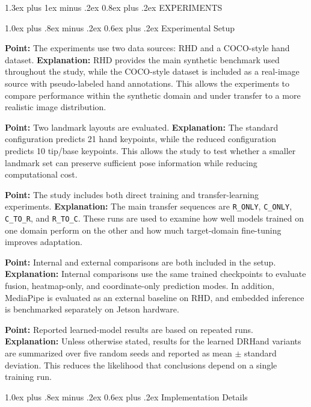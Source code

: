 \documentclass[10pt,letterpaper]{article}
\makeatletter
\renewcommand\section{\@startsection{section}{1}{\z@}%
  {1.3ex plus 1ex minus .2ex}%
  {0.8ex plus .2ex}%
  {\centering\normalfont\small\scshape}}
\renewcommand\subsection{\@startsection{subsection}{2}{\z@}%
  {1.0ex plus .8ex minus .2ex}%
  {0.6ex plus .2ex}%
  {\normalfont\itshape}}
\makeatother
\begin{document}
\section{EXPERIMENTS}

\subsection{Experimental Setup}

\noindent\textbf{Point:} The experiments use two data sources: RHD and a COCO-style hand dataset.  
\textbf{Explanation:} RHD provides the main synthetic benchmark used throughout the study, while the COCO-style dataset is included as a real-image source with pseudo-labeled hand annotations. This allows the experiments to compare performance within the synthetic domain and under transfer to a more realistic image distribution.

\medskip
\noindent\textbf{Point:} Two landmark layouts are evaluated.  
\textbf{Explanation:} The standard configuration predicts 21 hand keypoints, while the reduced configuration predicts 10 tip/base keypoints. This allows the study to test whether a smaller landmark set can preserve sufficient pose information while reducing computational cost.

\medskip
\noindent\textbf{Point:} The study includes both direct training and transfer-learning experiments.  
\textbf{Explanation:} The main transfer sequences are \texttt{R\_ONLY}, \texttt{C\_ONLY}, \texttt{C\_TO\_R}, and \texttt{R\_TO\_C}. These runs are used to examine how well models trained on one domain perform on the other and how much target-domain fine-tuning improves adaptation.

\medskip
\noindent\textbf{Point:} Internal and external comparisons are both included in the setup.  
\textbf{Explanation:} Internal comparisons use the same trained checkpoints to evaluate fusion, heatmap-only, and coordinate-only prediction modes. In addition, MediaPipe is evaluated as an external baseline on RHD, and embedded inference is benchmarked separately on Jetson hardware.

\medskip
\noindent\textbf{Point:} Reported learned-model results are based on repeated runs.  
\textbf{Explanation:} Unless otherwise stated, results for the learned DRHand variants are summarized over five random seeds and reported as mean $\pm$ standard deviation. This reduces the likelihood that conclusions depend on a single training run.

\subsection{Implementation Details}
\end{document}
